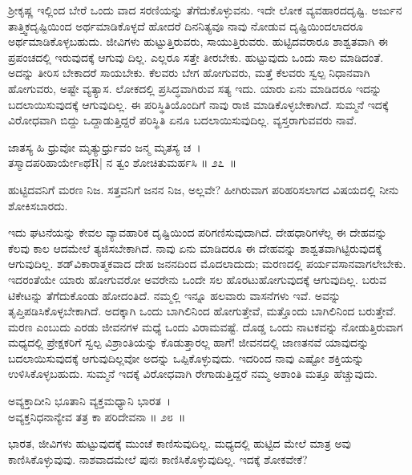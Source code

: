 ಶ‍್ರೀಕೃಷ್ಣ ಇಲ್ಲಿಂದ ಬೇರೆ ಒಂದು ವಾದ ಸರಣಿಯನ್ನು ತೆಗೆದುಕೊಳ್ಳುವನು. ಇದೇ ಲೋಕ ವ್ಯವಹಾರದದೃಷ್ಟಿ. ಅರ್ಜುನ ತಾತ್ತ್ವಿಕದೃಷ್ಟಿಯಿಂದ ಅರ್ಥಮಾಡಿಕೊಳ್ಳದೆ ಹೋದರೆ ದಿನನಿತ್ಯವೂ ನಾವು ನೋಡುವ ದೃಷ್ಟಿಯಿಂದಲಾದರೂ ಅರ್ಥಮಾಡಿಕೊಳ್ಳಬಹುದು. ಜೀವಿಗಳು ಹುಟ್ಟುತ್ತಿರುವರು, ಸಾಯುತ್ತಿರುವರು. ಹುಟ್ಟಿದವರಾರೂ ಶಾಶ್ವತವಾಗಿ ಈ ಪ್ರಪಂಚದಲ್ಲಿ ಇರುವುದಕ್ಕೆ ಆಗುವು ದಿಲ್ಲ. ಎಲ್ಲರೂ ಸತ್ತೇ ತೀರಬೇಕು. ಹುಟ್ಟುವುದು ಒಂದು ಸಾಲ ಮಾಡಿದಂತೆ. ಅದನ್ನು ತೀರಿಸ ಬೇಕಾದರೆ ಸಾಯಬೇಕು. ಕೆಲವರು ಬೇಗ ಹೋಗುವರು, ಮತ್ತೆ ಕೆಲವರು ಸ್ವಲ್ಪ ನಿಧಾನವಾಗಿ ಹೋಗುವರು, ಅಷ್ಟೇ ವ್ಯತ್ಯಾಸ. ಲೋಕದಲ್ಲಿ ಪ್ರಸಿದ್ಧವಾಗಿರುವ ಸತ್ಯ ಇದು. ಯಾರು ಏನು ಮಾಡಿದರೂ ಇದನ್ನು ಬದಲಾಯಿಸುವುದಕ್ಕೆ ಆಗುವುದಿಲ್ಲ. ಈ ಪರಿಸ್ಥಿತಿಯೊಂದಿಗೆ ನಾವು ರಾಜಿ ಮಾಡಿಕೊಳ್ಳಬೇಕಾಗಿದೆ. ಸುಮ್ಮನೆ ಇದಕ್ಕೆ ವಿರೋಧವಾಗಿ ಬಿದ್ದು ಒದ್ದಾಡುತ್ತಿದ್ದರೆ ಪರಿಸ್ಥಿತಿ ಏನೂ ಬದಲಾಯಿಸುವುದಿಲ್ಲ. ವ್ಯಸ್ತರಾಗುವವರು ನಾವೆ.

\begin{shloka}
ಜಾತಸ್ಯ ಹಿ ಧ್ರುವೋ ಮೃತ್ಯುರ್ಧ್ರುವಂ ಜನ್ಮ ಮೃತಸ್ಯ ಚ~।\\ತಸ್ಮಾದಪರಿಹಾರ್ಯೇsಥೆR| ನ ತ್ವಂ ಶೋಚಿತುಮರ್ಹಸಿ \hfill॥ ೨೭~॥
\end{shloka}

\begin{artha}
ಹುಟ್ಟಿದವನಿಗೆ ಮರಣ ನಿಜ. ಸತ್ತವನಿಗೆ ಜನನ ನಿಜ, ಅಲ್ಲವೇ? ಹೀಗಿರುವಾಗ ಪರಿಹರಿಸಲಾಗದ ವಿಷಯದಲ್ಲಿ ನೀನು ಶೋಕಿಸಬಾರದು.
\end{artha}

ಇದು ಘಟನೆಯನ್ನು ಕೇವಲ ವ್ಯಾವಹಾರಿಕ ದೃಷ್ಟಿಯಿಂದ ಪರಿಗಣಿಸುವುದಾಗಿದೆ. ದೇಹಧಾರಿಗಳೆಲ್ಲ ಈ ದೇಹವನ್ನು ಕೆಲವು ಕಾಲ ಆದಮೇಲೆ ತ್ಯಜಿಸಬೇಕಾಗಿದೆ. ನಾವು ಏನು ಮಾಡಿದರೂ ಈ ದೇಹವನ್ನು ಶಾಶ್ವತವಾಗಿಟ್ಟಿರುವುದಕ್ಕೆ ಆಗುವುದಿಲ್ಲ. ಶಡ್​ವಿಕಾರಾತ್ಮಕವಾದ ದೇಹ ಜನನದಿಂದ ಮೊದಲಾದುದು; ಮರಣದಲ್ಲಿ ಪರ್ಯವಸಾನವಾಗಲೇಬೇಕು. ಇದರಂತೆಯೇ ಯಾರು ಹೋಗುವರೋ ಅವರೇನು ಒಂದೇ ಸಲ ಹೊರಟುಹೋಗುವುದಕ್ಕೆ ಆಗುವುದಿಲ್ಲ. ಬರುವ ಟಿಕೇಟನ್ನು ತೆಗೆದುಕೊಂಡು ಹೋದಂತಿದೆ. ನಮ್ಮಲ್ಲಿ ಇನ್ನೂ ಹಲವಾರು ವಾಸನೆಗಳು ಇವೆ. ಅವನ್ನು ತೃಪ್ತಿಪಡಿಸಿಕೊಳ್ಳಬೇಕಾಗಿದೆ. ಅದಕ್ಕಾಗಿ ಒಂದು ಬಾಗಿಲಿನಿಂದ ಹೋಗುತ್ತೇವೆ, ಮತ್ತೊಂದು ಬಾಗಿಲಿನಿಂದ ಬರುತ್ತೇವೆ. ಮರಣ ಎಂಬುದು ಎರಡು ಜೀವನಗಳ ಮಧ್ಯೆ ಒಂದು ವಿರಾಮವಷ್ಟೆ. ದೊಡ್ಡ ಒಂದು ನಾಟಕವನ್ನು ನೋಡುತ್ತಿರುವಾಗ ಮಧ್ಯದಲ್ಲಿ ಪ್ರೇಕ್ಷಕರಿಗೆ ಸ್ವಲ್ಪ ವಿಶ್ರಾಂತಿಯನ್ನು ಕೊಡುತ್ತಾರಲ್ಲ ಹಾಗೆ! ಜೀವನದಲ್ಲಿ ಜಾಣತನವೆ ಯಾವುದನ್ನು ಬದಲಾಯಿಸುವುದಕ್ಕೆ ಆಗುವುದಿಲ್ಲವೋ ಅದನ್ನು ಒಪ್ಪಿಕೊಳ್ಳುವುದು. ಇದರಿಂದ ನಾವು ಎಷ್ಟೋ ಶಕ್ತಿಯನ್ನು ಉಳಿಸಿಕೊಳ್ಳಬಹುದು. ಸುಮ್ಮನೆ ಇದಕ್ಕೆ ವಿರೋಧವಾಗಿ ರೇಗಾಡುತ್ತಿದ್ದರೆ ನಮ್ಮ ಅಶಾಂತಿ ಮತ್ತೂ ಹೆಚ್ಚುವುದು.

\begin{shloka}
ಅವ್ಯಕ್ತಾದೀನಿ ಭೂತಾನಿ ವ್ಯಕ್ತಮಧ್ಯಾನಿ ಭಾರತ~।\\ಅವ್ಯಕ್ತನಿಧನಾನ್ಯೇವ ತತ್ರ ಕಾ ಪರಿದೇವನಾ \hfill॥ ೨೮~॥
\end{shloka}

\begin{artha}
ಭಾರತ, ಜೀವಿಗಳು ಹುಟ್ಟುವುದಕ್ಕೆ ಮುಂಚೆ ಕಾಣಿಸುವುದಿಲ್ಲ. ಮಧ್ಯದಲ್ಲಿ ಹುಟ್ಟಿದ ಮೇಲೆ ಮಾತ್ರ ಅವು ಕಾಣಿಸಿಕೊಳ್ಳುವುವು. ನಾಶವಾದಮೇಲೆ ಪುನಃ ಕಾಣಿಸಿಕೊಳ್ಳುವುದಿಲ್ಲ. ಇದಕ್ಕೆ ಶೋಕವೇಕೆ?
\end{artha}

